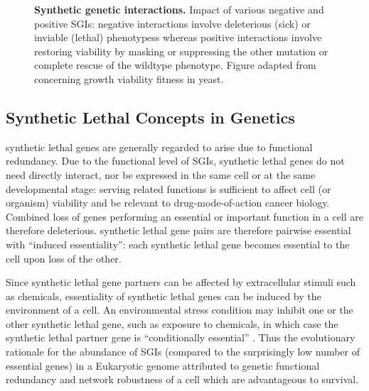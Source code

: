 \begin{figure}[!ht]
   \caption[Synthetic genetic interactions]{\small \textbf{Synthetic genetic interactions.} Impact of various negative and positive \glspl{SGI}: negative interactions involve deleterious (sick) or inviable (lethal) phenotypess whereas positive interactions involve restoring viability by masking or suppressing the other mutation or complete rescue of the wildtype phenotype. Figure adapted from \citep{Costanzo2011} concerning growth viability fitness in yeast.}
\label{fig:Costanzo2011}
\end{figure}

\subsection{Synthetic Lethal Concepts in Genetics}

\Gls{synthetic lethal} genes are generally regarded to arise due to functional redundancy. Due to the functional level of \glspl{SGI}, \gls{synthetic lethal} genes do not need directly interact, nor be expressed in the same cell or at the same developmental stage: serving related functions is sufficient to affect cell (or organism) viability and be relevant to drug-mode-of-action cancer biology. Combined loss of genes performing an essential or important function in a cell are therefore deleterious. \Gls{synthetic lethal} gene pairs are therefore pairwise essential with ``induced essentiality'': each \gls{synthetic lethal} gene becomes essential to the cell upon loss of the other.

Since \gls{synthetic lethal} gene partners can be affected by extracellular stimuli such as chemicals, essentiality of \gls{synthetic lethal} genes can be induced by the environment of a cell.  An environmental stress condition may inhibit one or the other \gls{synthetic lethal} gene, such as exposure to chemicals, in which case the \gls{synthetic lethal} partner gene is ``conditionally essential'' \citep{Hillenmeyer2008}. Thus the evolutionary rationale for the abundance of \glspl{SGI} (compared to the surprisingly low number of essential genes) in a Eukaryotic genome attributed to genetic functional redundancy and network robustness of a cell which are advantageous to survival. 

